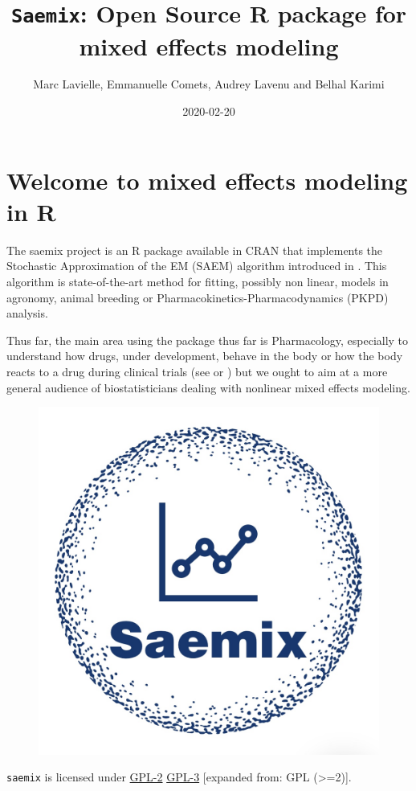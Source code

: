 \documentclass[]{book}
\title{\texttt{Saemix}: Open Source R package for mixed effects modeling}
\author{Marc Lavielle, Emmanuelle Comets, Audrey Lavenu and Belhal Karimi}
\date{2020-02-20}
\begin{document}
\maketitle

{
\hypersetup{linkcolor=black}
\setcounter{tocdepth}{1}
\tableofcontents
}
\chapter*{Welcome to mixed effects modeling in
R}\label{welcome-to-mixed-effects-modeling-in-r}

The saemix project is an R package \citep{saemix2017} available in CRAN
that implements the Stochastic Approximation of the EM (SAEM) algorithm
introduced in \citep{kuhn}. This algorithm is state-of-the-art method
for fitting, possibly non linear, models in agronomy, animal breeding or
Pharmacokinetics-Pharmacodynamics (PKPD) analysis.

Thus far, the main area using the package thus far is Pharmacology,
especially to understand how drugs, under development, behave in the
body or how the body reacts to a drug during clinical trials (see
\citep{karimi2020f} or \citep{samson2006extension}) but we ought to aim
at a more general audience of biostatisticians dealing with nonlinear
mixed effects modeling.

\begin{figure}

{\centering \includegraphics[width=0.6\linewidth]{figures/logo1} 

}

\end{figure}

\texttt{saemix} is licensed under
\href{https://cran.r-project.org/web/licenses/GPL-2}{GPL-2} \textbar{}
\href{https://cran.r-project.org/web/licenses/GPL-3}{GPL-3} {[}expanded
from: GPL (\textgreater{}=2){]}.
\end{document}
